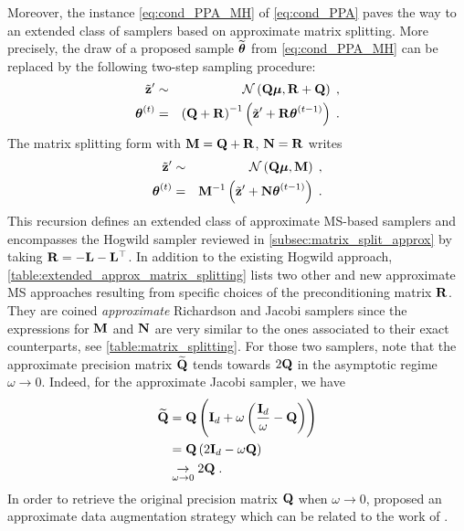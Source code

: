 \documentclass[nohypdvips,onefignum,onetabnum]{siamart171218}
\begin{document}
Moreover, the instance \cref{eq:cond_PPA_MH} of \cref{eq:cond_PPA} paves the way to an extended class of samplers based on approximate matrix splitting.
More precisely, the draw of a proposed sample $\widetilde{\boldsymbol{\theta}}$ from \cref{eq:cond_PPA_MH} can be replaced by the following two-step sampling procedure:
\begin{eqnarray}
\label{eq:recursion522}
  \tilde{\B{z}}' &\sim & \mathcal{N}\pr{\B{Q}\Bs{\mu}, \B{R} + \B{Q}}\eqsp,\\
  \Bs{\theta}^{(t)} & = & \pr{\B{Q}+\B{R}}^{-1}\pr{\tilde{\B{z}}'+\B{R}\Bs{\theta}^{(t-1)}}\eqsp.
\end{eqnarray}
The matrix splitting form with $\mathbf{M} = \mathbf{Q}+\mathbf{R}$, $\mathbf{N}=\mathbf{R}$ writes
\begin{eqnarray}
  \tilde{\B{z}}' &\sim & \mathcal{N}\pr{\B{Q}\Bs{\mu}, \B{M}}\eqsp,\\
  \Bs{\theta}^{(t)} & = & \B{M}^{-1}\pr{\tilde{\B{z}}' + \B{N}\Bs{\theta}^{(t-1)}}\eqsp. \label{eq:MS_proposal}
\end{eqnarray}
This recursion defines an extended class of approximate MS-based samplers and encompasses the Hogwild sampler reviewed in \cref{subsec:matrix_split_approx} by taking $\mathbf{R} = -\mathbf{L} - \mathbf{L}^{\top}$.
In addition to the existing Hogwild approach, \cref{table:extended_approx_matrix_splitting} lists two other and new approximate MS approaches resulting from specific choices of the preconditioning matrix $\mathbf{R}$.
They are coined \textit{approximate} Richardson and Jacobi samplers since the expressions for $\mathbf{M}$ and $\mathbf{N}$ are very similar to the ones associated to their exact counterparts, see \cref{table:matrix_splitting}.
For those two samplers, note that the approximate precision matrix $\widetilde{\mathbf{Q}}$ tends towards $2\mathbf{Q}$ in the asymptotic regime $\omega \rightarrow 0$.
Indeed, for the approximate Jacobi sampler, we have
\begin{align*}
 \widetilde{\mathbf{Q}} &= \mathbf{Q}\left(\mathbf{I}_d + \omega\left(\frac{\mathbf{I}_d}{\omega} - \mathbf{Q}\right)\right) \\
 &= \mathbf{Q}\left(2\mathbf{I}_d - \omega\mathbf{Q}\right) \\
 &\underset{\omega\rightarrow 0}{\rightarrow} 2\mathbf{Q}\;.
\end{align*}
In order to retrieve the original precision matrix $\mathbf{Q}$ when $\omega \rightarrow 0$, \cite{Barbos2017} proposed an approximate data augmentation strategy which can be related to the work of \cite{Vono_2019sub}. 
\end{document}

